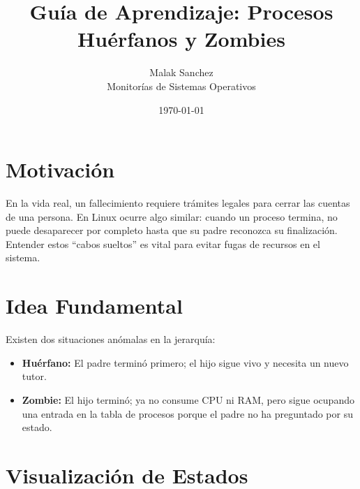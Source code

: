 \documentclass[12pt,a4paper]{article}
\title{\textbf{Guía de Aprendizaje: Procesos Huérfanos y Zombies}}
\author{Malak Sanchez \\ \small Monitorías de Sistemas Operativos}
\date{\today}
\begin{document}
\maketitle

\section{Motivación}
En la vida real, un fallecimiento requiere trámites legales para cerrar las cuentas de una persona. En Linux ocurre algo similar: cuando un proceso termina, no puede desaparecer por completo hasta que su padre reconozca su finalización. Entender estos ``cabos sueltos'' es vital para evitar fugas de recursos en el sistema.

\section{Idea Fundamental}
Existen dos situaciones anómalas en la jerarquía:
\begin{itemize}
    \item \textbf{Huérfano:} El padre terminó primero; el hijo sigue vivo y necesita un nuevo tutor.
    \item \textbf{Zombie:} El hijo terminó; ya no consume CPU ni RAM, pero sigue ocupando una entrada en la tabla de procesos porque el padre no ha preguntado por su estado.
\end{itemize}

\section{Visualización de Estados}
\begin{center}
\end{center}
\end{document}
